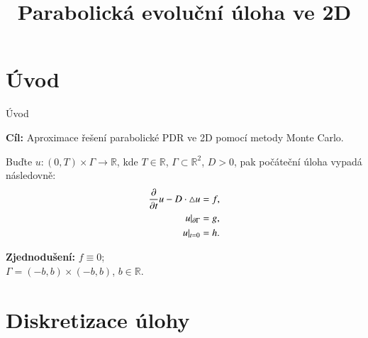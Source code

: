 
\title{Parabolická evoluční úloha ve 2D}


\renewcommand{\vec}[1]{\boldsymbol{#1}}
\newcommand*\Laplace{\mathop{}\!\mathbin\bigtriangleup}
\newcommand*\midpoint[1]{\overline{#1}}





\section{Úvod}

\begin{frame}{Úvod}
\begin{block}{\textbf{Cíl:}}
Aproximace řešení parabolické PDR ve 2D pomocí metody Monte Carlo.
\end{block}
Buďte $u:(0,T)\times\Gamma\longrightarrow\mathbb{R}$, kde $T\in\mathbb{R}$, $\Gamma\subset\mathbb{R}^{2}$, $D>0$, pak počáteční úloha vypadá následovně:
\begin{equation*} \label{ini_problem}
	\begin{split}
		\frac{\partial}{\partial t}u-D\cdot\Laplace u&=f,\\
		u\arrowvert_{\partial\Gamma}&=g,\\
		u\arrowvert_{t=0}&=h.
	\end{split}
\end{equation*}
\begin{alertblock}{\textbf{Zjednodušení:}}
	\centering $f\equiv 0$;\\
	$\Gamma=(-b,b)\times(-b,b)$, $b\in\mathbb{R}$.
\end{alertblock}
\end{frame}



\section{Diskretizace úlohy}

